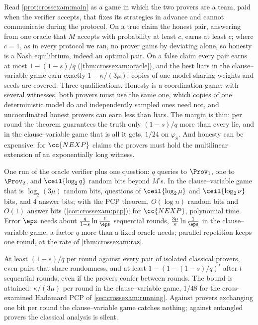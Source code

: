 \begin{refsection}
\questionone Read \cref{prot:crossexam:main} as a game in which the two provers are a team, paid when the verifier accepts, that fixes its strategies in advance and cannot communicate during the protocol. On a true claim the honest pair, answering from one oracle that $M$ accepts with probability at least $c$, earns at least $c$; where $c=1$, as in every protocol we ran, no prover gains by deviating alone, so honesty is a Nash equilibrium, indeed an optimal pair. On a false claim every pair earns at most $1-(1-s)/q$ (\cref{thm:crossexam:oracle}), and the best liars in the clause--variable game earn exactly $1-\kappa/(3\mu)$; copies of one model sharing weights and seeds are covered. Three qualifications. Honesty is a coordination game: with several witnesses, both provers must use the same one, which copies of one deterministic model do and independently sampled ones need not, and uncoordinated honest provers can earn less than liars. The margin is thin: per round the theorem guarantees the truth only $(1-s)/q$ more than every lie, and in the clause--variable game that is all it gets, $1/24$ on $\varphi_8$. And honesty can be expensive: for $\cc{NEXP}$ claims the provers must hold the multilinear extension of an exponentially long witness.

\questiontwo One run of the oracle verifier plus one question: $q$ queries to $\Prov_1$, one to $\Prov_2$, and $\ceil{\log_2q}$ random bits beyond $M$'s. In the clause--variable game that is $\log_2(3\mu)$ random bits, questions of $\ceil{\log_2\mu}$ and $\ceil{\log_2\nu}$ bits, and $4$ answer bits; with the PCP theorem, $O(\log n)$ random bits and $O(1)$ answer bits (\cref{cor:crossexam:pcp}); for $\cc{NEXP}$, polynomial time. Error $\eps$ needs about $\frac q{1-s}\ln\frac1\eps$ sequential rounds, $\frac{3\mu}\kappa\ln\frac1\eps$ in the clause--variable game, a factor $q$ more than a fixed oracle needs; parallel repetition keeps one round, at the rate of \cref{thm:crossexam:raz}.

\questionthree At least $(1-s)/q$ per round against every pair of isolated classical provers, even pairs that share randomness, and at least $1-(1-(1-s)/q)^t$ after $t$ sequential rounds, even if the provers confer between rounds. The bound is attained: $\kappa/(3\mu)$ per round in the clause--variable game, $1/48$ for the cross-examined Hadamard PCP of \cref{sec:crossexam:running}. Against provers exchanging one bit per round the clause--variable game catches nothing; against entangled provers the classical analysis is silent.


\end{refsection}
